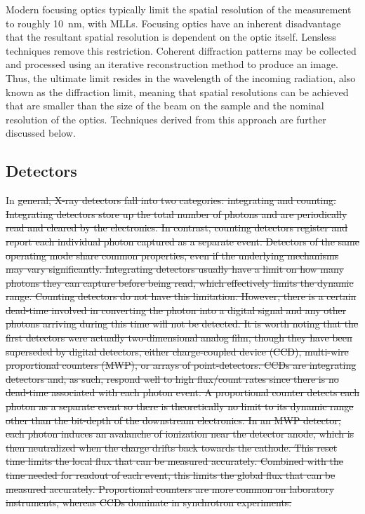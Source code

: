 \documentclass[journal=cmatex,manuscript=perspective]{achemso}
\providecommand{\DIFdeltex}[1]{{\protect\color{red}\sout{#1}}}                      %
\providecommand{\DIFdelbegin}{} %
\providecommand{\DIFdel}[1]{\texorpdfstring{\DIFdeltex{#1}}{}} %
\begin{document}
Modern focusing optics typically limit the spatial resolution of the
measurement to roughly \SI{10}{nm}, with MLLs\cite{yan2014}. Focusing
optics have an inherent disadvantage that the resultant spatial
resolution is dependent on the optic itself. Lensless techniques
remove this restriction. Coherent diffraction patterns may be
collected and processed using an iterative reconstruction method to
produce an image. Thus, the ultimate limit resides in the wavelength
of the incoming radiation, also known as the diffraction limit,
meaning that spatial resolutions can be achieved that are smaller than
the size of the beam on the sample and the nominal resolution of the
optics. Techniques derived from this approach are further discussed
below.

\subsection{Detectors}

In \DIFdelbegin \DIFdel{general, X-ray detectors fall into two categories: integrating and
counting. Integrating detectors store up the total number of photons
and are periodically read and cleared by the electronics. In contrast,
counting detectors register and report each individual photon captured
as a separate event. Detectors of the same operating mode share common
properties, even if the underlying mechanisms may vary
significantly. Integrating detectors usually have a limit on how many
photons they can capture before being read, which effectively limits
the dynamic range. Counting detectors do not have this
limitation. However, there is a certain dead-time involved in
converting the photon into a digital signal and any other photons
arriving during this time will not be detected. It is worth noting
that the first detectors were actually two-dimensional analog film,
though they have been superseded by digital detectors, either
charge-coupled device (CCD), multi-wire proportional counters (MWP),
or arrays of point-detectors. CCDs are integrating detectors and, as
such, respond well to high flux/count rates since there is no
dead-time associated with each photon event. A proportional counter
detects each photon as a separate event so there is theoretically no
limit to its dynamic range other than the bit-depth of the downstream
electronics. In an MWP detector, each photon induces an avalanche of
ionization near the detector anode, which is then neutralized when the
charge drifts back towards the cathode. This reset time limits the
local flux that can be measured accurately. Combined with the time
needed for readout of each event, this limits the global flux that can
be measured accurately. Proportional counters are more common on
laboratory instruments, whereas CCDs dominate in synchrotron
experiments.
}%
\end{document}
